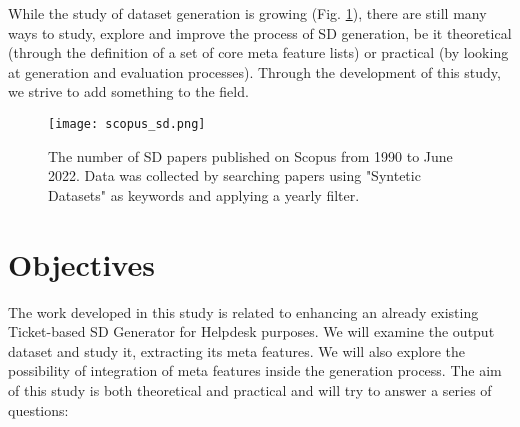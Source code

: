 While the study of dataset generation is growing (Fig. \ref{fig:sdpapers}), there are still many ways to study, explore and improve the process of SD generation, be it theoretical (through the definition of a set of core meta feature lists) or practical (by looking at generation and evaluation processes). Through the development of this study, we strive to add something to the field.

\begin{figure}[t]
  \begin{center}
    \leavevmode
    \texttt{[image: scopus\_sd.png]}
    \caption[Number of Synthetic Dataset related papers published on Scopus from 1990 to June 2022]{The number of SD papers published on Scopus from 1990 to June 2022. Data was collected by searching papers using "Syntetic Datasets" as keywords and applying a yearly filter.}
    \label{fig:sdpapers}
  \end{center}
\end{figure}


\section{Objectives}
The work developed in this study is related to enhancing an already existing Ticket-based SD Generator for Helpdesk purposes. We will examine the output dataset and study it, extracting its meta features. We will also explore the possibility of integration of meta features inside the generation process. The aim of this study is both theoretical and practical and will try to answer a series of questions:


